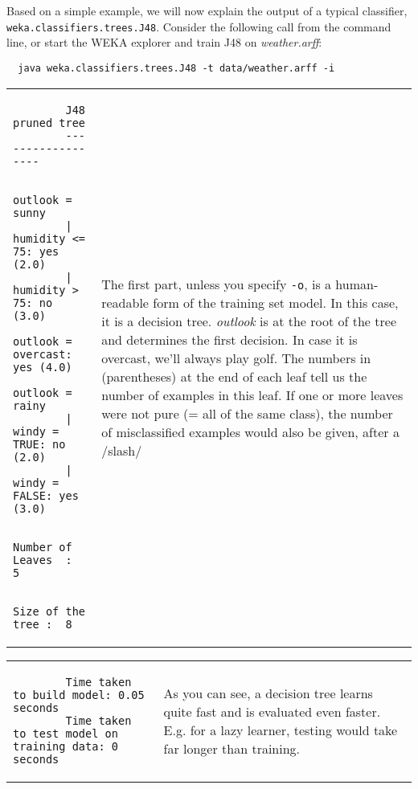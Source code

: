 Based on a simple example, we will now explain the output of a typical classifier, \texttt{weka.classifiers.trees.J48}. Consider the following call from the command line, or start the WEKA explorer and train J48 on \textit{weather.arff}:

{\scriptsize
\begin{verbatim}
  java weka.classifiers.trees.J48 -t data/weather.arff -i
\end{verbatim}}

\vspace{0.5cm}
\noindent
\begin{tabular}{l l}
	\begin{minipage}{7cm}
		{\scriptsize
		\begin{verbatim}
		J48 pruned tree
		------------------
		
		outlook = sunny
		|   humidity <= 75: yes (2.0)
		|   humidity > 75: no (3.0)
		outlook = overcast: yes (4.0)
		outlook = rainy
		|   windy = TRUE: no (2.0)
		|   windy = FALSE: yes (3.0)
		
		Number of Leaves  :  5
		
		Size of the tree :  8
		\end{verbatim}}
	\end{minipage}
	&
	\begin{minipage}{5cm}
	The first part, unless you specify \texttt{-o}, is a human-readable form of the training set model. In this case, it is a decision tree. \textit{outlook} is at the root of the tree and determines the first decision. In case it is overcast, we'll always play golf. The numbers in (parentheses) at the end of each leaf tell us the number of examples in this leaf. If one or more leaves were not pure (= all of the same class), the number of misclassified examples would also be given, after a /slash/
	\end{minipage}
	\\
\end{tabular}

\vspace{0.5cm}
\noindent
\begin{tabular}{l l}
	\begin{minipage}{7cm}
		{\scriptsize
		\begin{verbatim}
		Time taken to build model: 0.05 seconds
		Time taken to test model on training data: 0 seconds
		\end{verbatim}}
	\end{minipage}
	&
	\begin{minipage}{5cm}
	As you can see, a decision tree learns quite fast and is evaluated even faster. E.g. for a lazy learner, testing would take far longer than training.
	\end{minipage}
	\\
\end{tabular}

